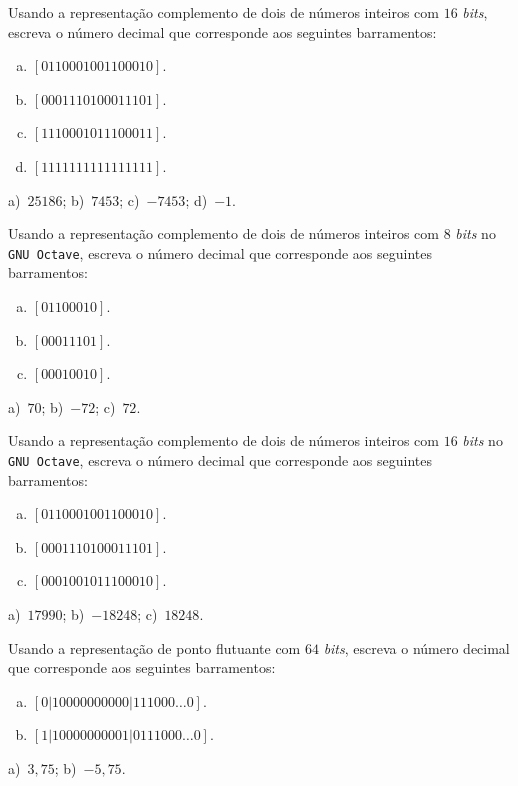 \begin{exer}
  Usando a representação complemento de dois de números inteiros com $16$ \emph{bits}, escreva o número decimal que corresponde aos seguintes barramentos:
  \begin{enumerate}[a)]
  \item $[0110001001100010]$.
  \item $[0001110100011101]$.
  \item $[1110001011100011]$.
  \item $[1111111111111111]$.
   \end{enumerate}
\end{exer}
\begin{resp}
  a)~$25186$; b)~$7453$; c)~$-7453$; d)~$-1$.
\end{resp}


\ifisoctave
\begin{exer}
  Usando a representação complemento de dois de números inteiros com $8$ \emph{bits} no \verb+GNU Octave+, escreva o número decimal que corresponde aos seguintes barramentos:
  \begin{enumerate}[a)]
  \item $[01100010]$.
  \item $[00011101]$.
  \item $[00010010]$.
  \end{enumerate}
\end{exer}
\begin{resp}
  a)~$70$; b)~$-72$; c)~$72$.
\end{resp}
\fi

\ifisoctave
\begin{exer}
  Usando a representação complemento de dois de números inteiros com $16$ \emph{bits} no \verb+GNU Octave+, escreva o número decimal que corresponde aos seguintes barramentos:
  \begin{enumerate}[a)]
  \item $[0110001001100010]$.
  \item $[0001110100011101]$.
  \item $[0001001011100010]$.
  \end{enumerate}
\end{exer}
\begin{resp}
  a)~$17990$; b)~$-18248$; c)~$18248$.
\end{resp}
\fi

\begin{exer}
  Usando a representação de ponto flutuante com $64$ \emph{bits}, escreva o número decimal que corresponde aos seguintes barramentos:
  \begin{enumerate}[a)]
  \item $[0|10000000000|111000\ldots 0]$.
  \item $[1|10000000001|0111000\ldots 0]$.
  \end{enumerate}
\end{exer}
\begin{resp}
  a)~$3,75$; b)~$-5,75$.
\end{resp}

